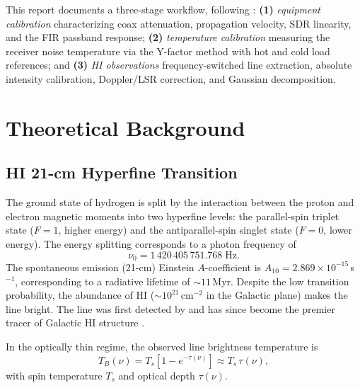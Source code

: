 \documentclass[10pt,preprint2]{aastex}
\begin{document}
This report documents a three-stage workflow, following
\citet{parsons2024bighorn}:
\textbf{(1)} \emph{equipment calibration} characterizing coax attenuation,
propagation velocity, SDR linearity, and the FIR passband response;
\textbf{(2)} \emph{temperature calibration} measuring the receiver noise temperature
via the Y-factor method with hot and cold load references; and
\textbf{(3)} \emph{HI observations} frequency-switched line extraction,
absolute intensity calibration, Doppler/LSR correction, and Gaussian decomposition.

\section{Theoretical Background}
\label{sec:theory}

\subsection{HI 21-cm Hyperfine Transition}
\label{sec:theory_hi}

The ground state of hydrogen is split by the interaction between the proton
and electron magnetic moments into two hyperfine levels:
the parallel-spin triplet state ($F=1$, higher energy) and the
antiparallel-spin singlet state ($F=0$, lower energy).
The energy splitting corresponds to a photon frequency of
\begin{equation}
  \nu_0 = 1\,420\,405\,751.768\;\mathrm{Hz}.
\end{equation}
The spontaneous emission (21-cm) Einstein $A$-coefficient is
$A_{10} = 2.869 \times 10^{-15}$\,s$^{-1}$, corresponding to a radiative
lifetime of $\sim 11$\,Myr.
Despite the low transition probability, the abundance of HI ($\sim 10^{21}$\,cm$^{-2}$
in the Galactic plane) makes the line bright.
The line was first detected by \citealt{ewen1951} and has since become
the premier tracer of Galactic HI structure \citep{dickey1990}.

In the optically thin regime, the observed line brightness temperature is
\begin{equation}
  T_B(\nu) = T_s \left[1 - e^{-\tau(\nu)}\right] \approx T_s\,\tau(\nu),
\end{equation}
with spin temperature $T_s$ and optical depth $\tau(\nu)$.
\end{document}
